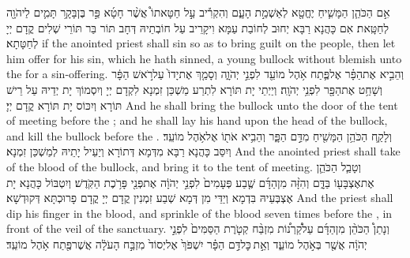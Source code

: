 {אִ֣ם הַכֹּהֵ֧ן הַמָּשִׁ֛יחַ יֶחֱטָ֖א לְאַשְׁמַ֣ת הָעָ֑ם וְהִקְרִ֡יב עַ֣ל חַטָּאתוֹ֩ אֲשֶׁ֨ר חָטָ֜א פַּ֣ר בֶּן\maqqaf בָּקָ֥ר תָּמִ֛ים לַיהֹוָ֖ה לְחַטָּֽאת׃}
{אִם כָּהֲנָא רַבָּא יְחוּב לְחוֹבַת עַמָּא וִיקָרֵיב עַל חוֹבְתֵיהּ דְּחָב תּוֹר בַּר תּוֹרֵי שְׁלִים קֳדָם יְיָ לְחַטָּתָא׃}
{if the anointed priest shall sin so as to bring guilt on the people, then let him offer for his sin, which he hath sinned, a young bullock without blemish unto the \lord\space for a sin-offering.}{}
{וְהֵבִ֣יא אֶת\maqqaf הַפָּ֗ר אֶל\maqqaf פֶּ֛תַח אֹ֥הֶל מוֹעֵ֖ד לִפְנֵ֣י יְהֹוָ֑ה וְסָמַ֤ךְ אֶת\maqqaf יָדוֹ֙ עַל\maqqaf רֹ֣אשׁ הַפָּ֔ר וְשָׁחַ֥ט אֶת\maqqaf הַפָּ֖ר לִפְנֵ֥י יְהֹוָֽה׃}
{וְיַיְתֵי יָת תּוֹרָא לִתְרַע מַשְׁכַּן זִמְנָא לִקְדָם יְיָ וְיִסְמוֹךְ יָת יְדֵיהּ עַל רֵישׁ תּוֹרָא וְיִכּוֹס יָת תּוֹרָא קֳדָם יְיָ׃}
{And he shall bring the bullock unto the door of the tent of meeting before the \lord; and he shall lay his hand upon the head of the bullock, and kill the bullock before the \lord.}{}
{וְלָקַ֛ח הַכֹּהֵ֥ן הַמָּשִׁ֖יחַ מִדַּ֣ם הַפָּ֑ר וְהֵבִ֥יא אֹת֖וֹ אֶל\maqqaf אֹ֥הֶל מוֹעֵֽד׃}
{וְיִסַּב כָּהֲנָא רַבָּא מִדְּמָא דְּתוֹרָא וְיַעֵיל יָתֵיהּ לְמַשְׁכַּן זִמְנָא׃}
{And the anointed priest shall take of the blood of the bullock, and bring it to the tent of meeting.}{}
{וְטָבַ֧ל הַכֹּהֵ֛ן אֶת\maqqaf אֶצְבָּע֖וֹ בַּדָּ֑ם וְהִזָּ֨ה מִן\maqqaf הַדָּ֜ם שֶׁ֤בַע פְּעָמִים֙ לִפְנֵ֣י יְהֹוָ֔ה אֶת\maqqaf פְּנֵ֖י פָּרֹ֥כֶת הַקֹּֽדֶשׁ׃}
{וְיִטְבּוֹל כָּהֲנָא יָת אֶצְבְּעֵיהּ בִּדְמָא וְיַדֵּי מִן דְּמָא שְׁבַע זִמְנִין קֳדָם יְיָ קֳדָם פָרוּכְתָּא דְּקוּדְשָׁא׃}
{And the priest shall dip his finger in the blood, and sprinkle of the blood seven times before the \lord, in front of the veil of the sanctuary.}{}
{וְנָתַן֩ הַכֹּהֵ֨ן מִן\maqqaf הַדָּ֜ם עַל\maqqaf קַ֠רְנ֠וֹת מִזְבַּ֨ח קְטֹ֤רֶת הַסַּמִּים֙ לִפְנֵ֣י יְהֹוָ֔ה אֲשֶׁ֖ר בְּאֹ֣הֶל מוֹעֵ֑ד וְאֵ֣ת \legarmeh  כׇּל\maqqaf דַּ֣ם הַפָּ֗ר יִשְׁפֹּךְ֙ אֶל\maqqaf יְסוֹד֙ מִזְבַּ֣ח הָעֹלָ֔ה אֲשֶׁר\maqqaf פֶּ֖תַח אֹ֥הֶל מוֹעֵֽד׃}
